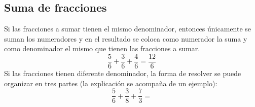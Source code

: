 \subsection{Suma de fracciones}
Si las fracciones a sumar tienen el mismo denominador, entonces únicamente se suman los numeradores y en el resultado se coloca como numerador la suma y como denominador el mismo que tienen las fracciones a sumar.\\
\begin{equation*}
\dfrac{5}{6}+\dfrac{3}{6}+\dfrac{4}{6}=\dfrac{12}{6}
\end{equation*}
Si las fracciones tienen diferente denominador, la forma de resolver se puede organizar en tres partes (la explicación se acompaña de un ejemplo):
\begin{equation*}
\dfrac{5}{6}+\dfrac{3}{8}+\dfrac{7}{3}=
\end{equation*}

